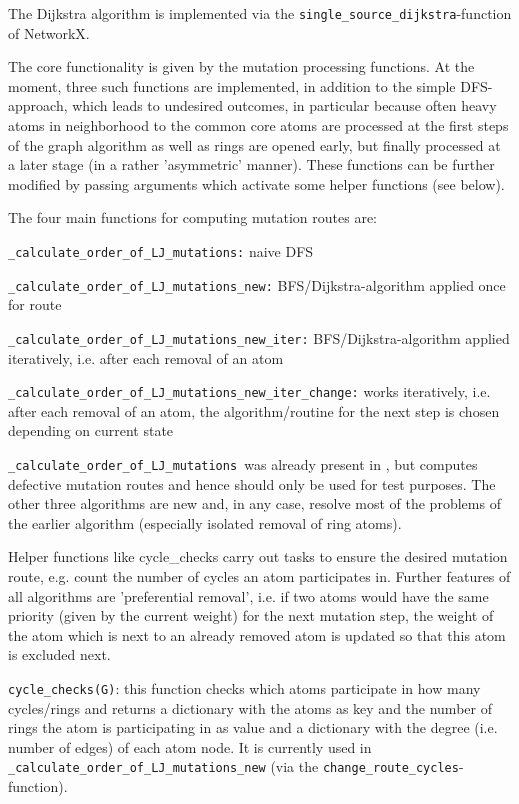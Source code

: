 The Dijkstra algorithm is implemented via the \texttt{single\_source\_dijkstra}-function
of NetworkX.

The core functionality is given by the mutation processing functions.
At the moment, three such functions are implemented, in addition to
the simple DFS-approach, which leads to undesired outcomes, in particular because often heavy atoms in neighborhood to the common core atoms are processed at the first steps of the graph algorithm as well as rings are opened early, but finally processed at a later stage (in a rather 'asymmetric' manner). These functions
can be further modified by passing arguments which activate some helper
functions (see below).

The four main functions for computing mutation routes are: 

\texttt{\_calculate\_order\_of\_LJ\_mutations:} naive DFS 

\texttt{\_calculate\_order\_of\_LJ\_mutations\_new:} BFS/Dijkstra-algorithm
applied once for route

\texttt{\_calculate\_order\_of\_LJ\_mutations\_new\_iter:} BFS/Dijkstra-algorithm
applied iteratively, i.e. after each removal of an atom 

\texttt{\_calculate\_order\_of\_LJ\_mutations\_new\_iter\_change:}
works iteratively, i.e. after each removal of an atom, the algorithm/routine for the next step is chosen depending on current state

\texttt{\_calculate\_order\_of\_LJ\_mutations }was already present in {\trafo}, but computes defective mutation routes and hence
should only be used for test purposes. The other three algorithms
are new and, in any case, resolve most of the problems of the earlier
algorithm (especially isolated removal of ring atoms).

Helper functions like cycle\_checks carry out tasks to ensure the
desired mutation route, e.g. count the number of cycles an atom participates
in. Further features of all algorithms are 'preferential removal',
i.e. if two atoms would have the same priority (given by the current
weight) for the next mutation step, the weight of the atom which is
next to an already removed atom is updated so that this atom is excluded
next.

\texttt{cycle\_checks(G)}: this function checks which atoms participate
in how many cycles/rings and returns a dictionary with the atoms as
key and the number of rings the atom is participating in as value
and a dictionary with the degree (i.e. number of edges) of each atom
node. It is currently used in \texttt{\_calculate\_order\_of\_LJ\_mutations\_new}
(via the \texttt{change\_route\_cycles}-function).

